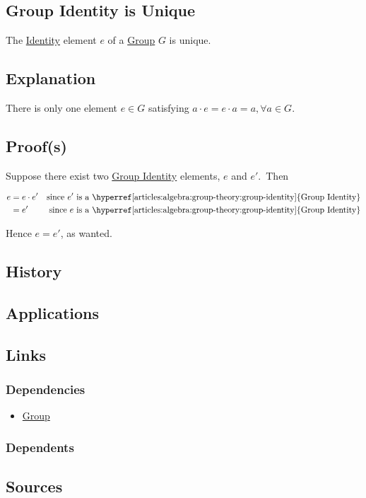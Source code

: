 \subsection{Group Identity is Unique}\label{articles:algebra:group-theory:group-identity-is-unique}
The \hyperref[articles:algebra:group-theory:group-identity]{Identity} element $e$ of a \hyperref[articles:algebra:group-theory:group]{Group} $G$ is unique.

\subsection{Explanation}
There is only one element $e \in G$ satisfying $a \cdot e = e \cdot a = a, \forall a \in G$.

\subsection{Proof(s)}
Suppose there exist two \hyperref[articles:algebra:group-theory:group-identity]{Group Identity} elements, $e$ and $e'$.\
Then

$$\begin{align*}
e &= e \cdot e' & \text{since $e'$ is a \hyperref[articles:algebra:group-theory:group-identity]{Group Identity}}\\
&= e' & \text{since $e$ is a \hyperref[articles:algebra:group-theory:group-identity]{Group Identity}}
\end{align*}$$

Hence $e = e'$, as wanted.

\subsection{History}

\subsection{Applications}

\subsection{Links}
\subsubsection{Dependencies}
\begin{itemize}
\item \hyperref[articles:algebra:group-theory:group]{Group}
\end{itemize}
\subsubsection{Dependents}

\subsection{Sources}

